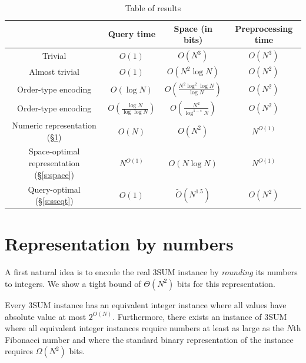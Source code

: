 \begin{table}
\centering
\caption{Table of results}\label{tor}
\begin{tabular}{cccc}
& Query time & Space (in bits) & Preprocessing time \\ \hline
Trivial & $O(1)$ & $O(N^3)$ & $O(N^3)$ \\
Almost trivial & $O(1)$ & $O(N^2 \log N)$ & $O(N^2)$ \\
Order-type encoding \cite{CCILO18} & $O(\log N)$ & $O(\frac{N^2 \log^2 \log N}{\log N})$ & $O(N^2) $\\
Order-type encoding \cite{CCILO18} & $O(\frac{\log N}{\log \log N})$ & $O(\frac{N^2 }{\log^{1-\epsilon} N})$ & $O(N^2)$ \\
Numeric representation (\S\ref{s:numbers}) & $O(N)$ & $O(N^2)$ & $N^{O(1)}$\\
Space-optimal representation (\S\ref{s:space}) & $N^{O(1)}$ & $O(N \log N)$ & $N^{O(1)}$\\
Query-optimal (\S\ref{s:sscqt}) &  $O(1)$ & $\tilde{O}(N^{1.5})$ & $O(N^{2})$ \\
\end{tabular}
\end{table}

\section{Representation by numbers} \label{s:numbers}

A first natural idea is to encode the real 3SUM instance by \emph{rounding} its numbers to integers.
We show a tight bound of $\Theta (N^2)$ bits for this representation.

\begin{lemma}
  \label{lem:bitsize}
Every 3SUM instance has an equivalent integer instance
where all values have absolute value at most $2^{O(N)}$. Furthermore, there
exists an instance of 3SUM where all equivalent integer instances
require numbers at least as large as the $N$th Fibonacci number and where the
standard binary representation of the instance requires $\Omega(N^2)$ bits.
\end{lemma}

